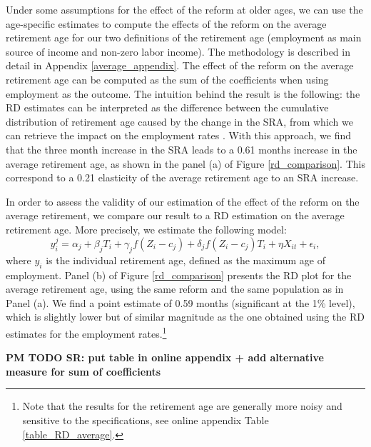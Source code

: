 \documentclass[12pt,a4paper]{article}
\begin{document}
Under some assumptions for the effect of the reform at older ages, we can use the age-specific estimates to compute the effects of the reform on the average retirement age for our two definitions of the retirement age (employment as main source of income and non-zero labor income). The methodology is described in detail in Appendix \ref{average_appendix}. The effect of the reform on the average retirement age can be computed as the sum of the coefficients when using employment as the outcome. The intuition behind the result is the following: the RD estimates can be interpreted as the difference between the cumulative distribution of retirement  age caused by the change in the SRA, from which we can retrieve the impact on the employment rates \citep[see also][]{mastrobuoni_labor_2009}. With this approach, we find that the three month increase in the SRA leads to a 0.61 months increase in the average retirement age, as shown in the panel (a) of Figure \ref{rd_comparison}. This correspond to a 0.21 elasticity of the average retirement age to an SRA increase. 

In order to assess the validity of our estimation of the effect of the reform on the average retirement, we compare our result to a RD estimation on the average retirement age. More precisely, we estimate the following model: 
\begin{equation}
	\label{eq_RD_average}
	y_{i}^j = \alpha_j  + \beta_j  T_{i} + \gamma_j f(Z_{i} - c_j)  + \delta_j f(Z_{i} - c_j) T_{i} + \eta X_{it} + \epsilon_{i},
\end{equation}
\noindent where $y_i$ is the individual retirement age, defined as the maximum age of employment. %
Panel (b) of Figure \ref{rd_comparison} presents the RD plot for the average retirement age, using the same reform and the same population as in Panel (a). We find a point estimate of 0.59 months (significant at the 1\% level),
which is slightly lower but of similar magnitude as the one obtained using the RD estimates for the employment rates.\footnote{Note that the results for the retirement age are generally more noisy and sensitive to the specifications, see online appendix Table \ref{table_RD_average}.} 

\textbf{PM TODO SR: put table in online appendix + add alternative measure for sum of coefficients}
\end{document}
